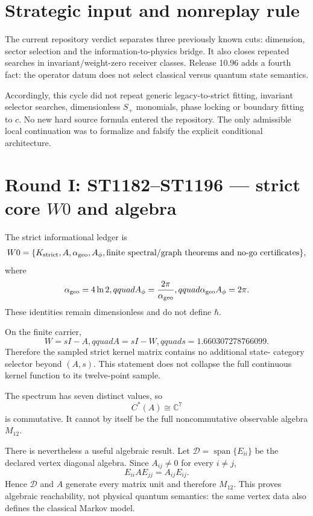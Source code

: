\documentclass[11pt,a4paper]{article}
\begin{document}
\tableofcontents\newpage

\section{Strategic input and nonreplay rule}

The current repository verdict separates three previously known cuts:
dimension, sector selection and the information-to-physics bridge.  It also
closes repeated searches in invariant/weight-zero receiver classes.  Release
10.96 adds a fourth fact: the operator datum does not select classical versus
quantum state semantics.

Accordingly, this cycle did not repeat generic legacy-to-strict fitting,
invariant selector searches, dimensionless $S_+$ monomials, phase locking or
boundary fitting to $c$.  No new hard source formula entered the repository.
The only admissible local continuation was to formalize and falsify the
explicit conditional architecture.

\section{Round I: ST1182--ST1196 --- strict core $W0$ and algebra}

The strict informational ledger is
\[
 W0=\{K_{\rm strict},A,\alpha_{\rm geo},A_\phi,
      \text{finite spectral/graph theorems and no-go certificates}\},
\]
where
\[
 \alpha_{\rm geo}=4\ln2,qquad
 A_\phi=\frac{2\pi}{\alpha_{\rm geo}},qquad
 \alpha_{\rm geo}A_\phi=2\pi.
\]
These identities remain dimensionless and do not define $\hbar$.

On the finite carrier,
\[
 W=sI-A,qquad A=sI-W,qquad s=1.660307278766099.
\]
Therefore the sampled strict kernel matrix contains no additional state-
category selector beyond $(A,s)$.  This statement does not collapse the full
continuous kernel function to its twelve-point sample.

The spectrum has seven distinct values, so
\[
 C^*(A)\cong\mathbb C^7
\]
is commutative.  It cannot by itself be the full noncommutative observable
algebra $M_{12}$.

There is nevertheless a useful algebraic result.  Let
$\mathcal D=\operatorname{span}\{E_{ii}\}$ be the declared vertex diagonal
algebra.  Since $A_{ij}\ne0$ for every $i\ne j$,
\[
 E_{ii}AE_{jj}=A_{ij}E_{ij}.
\]
Hence $\mathcal D$ and $A$ generate every matrix unit and therefore $M_{12}$.
This proves algebraic reachability, not physical quantum semantics: the same
vertex data also defines the classical Markov model.
\end{document}
